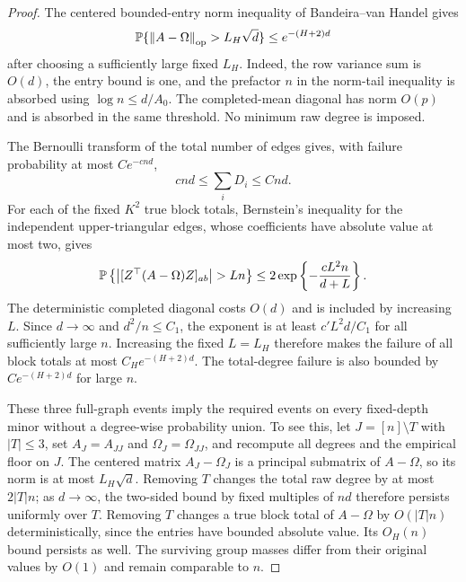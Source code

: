 \begin{proof}
The centered bounded-entry norm inequality of Bandeira--van Handel
\cite[Corollary 3.12 and Remark 3.13]{bvh} gives
\[
 \mathbb P\{\left\lVert A-\Omega\right\rVert_{\mathrm{op}}>L_H\sqrt d\}
 \le e^{-(H+2)d}
\]
after choosing a sufficiently large fixed $L_H$. Indeed, the row
variance sum is $O(d)$, the entry bound is one, and the prefactor $n$
in the norm-tail inequality is absorbed using $\log n\le d/A_0$.
The completed-mean diagonal has norm $O(p)$ and is absorbed in the
same threshold. No minimum raw degree is imposed.

The Bernoulli transform of the total number of edges gives, with
failure probability at most $Ce^{-cnd}$,
\[
 cnd\le\sum_iD_i\le Cnd.
\]
For each of the fixed $K^2$ true block totals, Bernstein's inequality
for the independent upper-triangular edges, whose coefficients have
absolute value at most two, gives
\[
 \PP\left\{\left|[Z^\top(A-\Omega)Z]_{ab}\right|>Ln\right\}
 \le 2\exp\left\{-\frac{cL^2n}{d+L}\right\}.
\]
The deterministic completed diagonal costs $O(d)$ and is included
by increasing $L$. Since $d\to\infty$ and $d^2/n\le C_1$,
the exponent is at least $c'L^2d/C_1$ for all sufficiently large $n$.
Increasing the fixed $L=L_H$ therefore makes the failure of all block
totals at most $C_He^{-(H+2)d}$. The total-degree failure is also
bounded by $Ce^{-(H+2)d}$ for large $n$.

These three full-graph events imply the required events on every
fixed-depth minor without a degree-wise probability union. To see this,
let $J=[n]\setminus T$ with $|T|\le3$, set $A_J=A_{JJ}$ and
$\Omega_J=\Omega_{JJ}$, and recompute all degrees and the empirical
floor on $J$. The centered matrix $A_J-\Omega_J$ is a principal
submatrix of $A-\Omega$, so its norm is at most $L_H\sqrt d$.
Removing $T$ changes the total raw degree by at most $2|T|n$;
as $d\to\infty$, the two-sided bound by fixed multiples of $nd$
therefore persists uniformly over $T$. Removing $T$ changes a true
block total of $A-\Omega$ by $O(|T|n)$ deterministically, since
the entries have bounded absolute value. Its $O_H(n)$ bound persists
as well. The surviving group masses differ from their original
values by $O(1)$ and remain comparable to $n$.


\end{proof}
